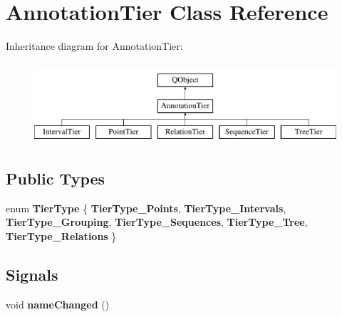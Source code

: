 \hypertarget{class_annotation_tier}{}\section{Annotation\+Tier Class Reference}
\label{class_annotation_tier}
Inheritance diagram for Annotation\+Tier\+:\begin{figure}[H]
\begin{center}
\leavevmode
\includegraphics[height=3.000000cm]{class_annotation_tier}
\end{center}
\end{figure}
\subsection*{Public Types}
\begin{DoxyCompactItemize}
\item 
\mbox{\label{class_annotation_tier_aad0b7862687212adcd3b2851fd62ba5d}} 
enum {\bfseries Tier\+Type} \{ \newline
{\bfseries Tier\+Type\+\_\+\+Points}, 
{\bfseries Tier\+Type\+\_\+\+Intervals}, 
{\bfseries Tier\+Type\+\_\+\+Grouping}, 
{\bfseries Tier\+Type\+\_\+\+Sequences}, 
\newline
{\bfseries Tier\+Type\+\_\+\+Tree}, 
{\bfseries Tier\+Type\+\_\+\+Relations}
 \}
\end{DoxyCompactItemize}
\subsection*{Signals}
\begin{DoxyCompactItemize}
\item 
\mbox{\label{class_annotation_tier_a26b44c87723f7e537a952a3342dfa784}} 
void {\bfseries name\+Changed} ()
\end{DoxyCompactItemize}
